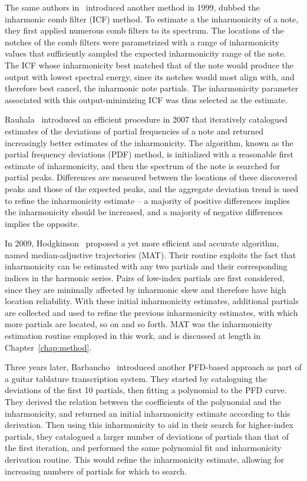 \documentclass[12pt]{cmuthesis}
\begin{document}
The same authors in~\cite{galembo1999} introduced another method in 1999, dubbed the inharmonic comb filter (ICF) method. To estimate a the inharmonicity of a note, they first applied numerous comb filters to its spectrum. The locations of the notches of the comb filters were parametrized with a range of inharmonicity values that sufficiently sampled the expected inharmonicity range of the note. The ICF whose inharmonicity best matched that of the note would produce the output with lowest spectral energy, since its notches would most align with, and therefore best cancel, the inharmonic note partials. The inharmonicity parameter associated with this output-minimizing ICF was thus selected as the estimate.
 
Rauhala~\cite{rauhala2007} introduced an efficient procedure in 2007 that iteratively catalogued estimates of the deviations of partial frequencies of a note and returned increasingly better estimates of the inharmonicity. The algorithm, known as the partial frequency deviations (PDF) method, is initialized with a reasonable first estimate of inharmonicity, and then the spectrum of the note is searched for partial peaks. Differences are measured between the locations of these discovered peaks and those of the expected peaks, and the aggregate deviation trend is used to refine the inharmonicity estimate -- a majority of positive differences implies the inharmonicity should be increased, and a majority of negative differences implies the opposite.

In 2009, Hodgkinson~\cite{hodgkinson2009} proposed a yet more efficient and accurate algorithm, named median-adjustive trajectories (MAT). Their routine exploits the fact that inharmonicity can be estimated with any two partials and their corresponding indices in the harmonic series. Pairs of low-index partials are first considered, since they are minimally affected by inharmonic skew and therefore have high location reliability. With these initial inharmonicity estimates, additional partials are collected and used to refine the previous inharmonicity estimates, with which more partials are located, so on and so forth. MAT was the inharmonicity estimation routine employed in this work, and is discussed at length in Chapter~\ref{chap:method}.

Three years later, Barbancho~\cite{barbanchoi2012} introduced another PFD-based approach as part of a guitar tablature transcription system. They started by cataloguing the deviations of the first 10 partials, then fitting a polynomial to the PFD curve. They derived the relation between the coefficients of the polynomial and the inharmonicity, and returned an initial inharmonicity estimate according to this derivation. Then using this inharmonicity to aid in their search for higher-index partials, they catalogued a larger number of deviations of partials than that of the first iteration, and performed the same polynomial fit and inharmonicity derivation routine. This would refine the inharmonicity estimate, allowing for increasing numbers of partials for which to search.
\end{document}
